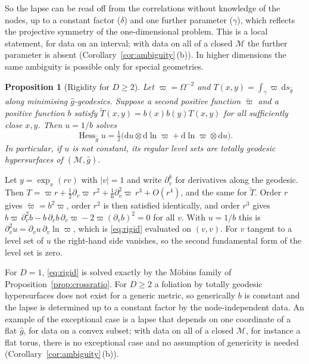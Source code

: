 \documentclass[11pt,a4paper]{article}
\makeatletter
\theoremstyle{stmt}
\newtheorem{proposition}[theorem]{Proposition}
\theoremstyle{defn}
\theoremstyle{rmk}
\renewenvironment{proof}[1][\proofname]{\par\pushQED{\qed}\normalfont\topsep6\p@\@plus6\p@\relax
  \trivlist\item[\hskip\labelsep{\sffamily\itshape\small #1.}]\ignorespaces}{\popQED\endtrivlist\@endpefalse}
\numberwithin{equation}{section}
\newcommand{\M}{\mathcal{M}}
\newcommand{\dd}{\mathrm{d}}
\makeatother
\begin{document}
So the lapse can be read off from the correlations without knowledge of the nodes, up to a constant factor ($\delta$) and one further parameter ($\gamma$), which reflects the projective symmetry of the one-dimensional problem. This is a local statement, for data on an interval; with data on all of a closed $\M$ the further parameter is absent (Corollary~\ref{cor:ambiguity}\,(b)). In higher dimensions the same ambiguity is possible only for special geometries.

\begin{proposition}[Rigidity for $D\ge2$]\label{prop:rigid}
Let $\varpi=\Omega^{-2}$ and $T(x,y)=\int_\gamma\varpi\,\dd s_{\hat g}$ along minimising $\hat g$-geodesics. Suppose a second positive function $\tilde\varpi$ and a positive function $b$ satisfy $\tilde T(x,y)=b(x)b(y)T(x,y)$ for all sufficiently close $x,y$. Then $u=1/b$ solves
\begin{equation}\label{eq:rigid}
\operatorname{Hess}_{\hat g}u=\tfrac12\big(\dd u\otimes\dd\ln\varpi+\dd\ln\varpi\otimes\dd u\big).
\end{equation}
In particular, if $u$ is not constant, its regular level sets are totally geodesic hypersurfaces of $(\M,\hat g)$.
\end{proposition}

\begin{proof}
Let $y=\exp_x(rv)$ with $|v|=1$ and write $\partial_v^k$ for derivatives along the geodesic. Then $T=\varpi r+\tfrac12\partial_v\varpi\,r^2+\tfrac16\partial_v^2\varpi\,r^3+O(r^4)$, and the same for $\tilde T$. Order $r$ gives $\tilde\varpi=b^2\varpi$, order $r^2$ is then satisfied identically, and order $r^3$ gives $b\varpi\,\partial_v^2b-b\,\partial_vb\,\partial_v\varpi-2\varpi(\partial_vb)^2=0$ for all $v$. With $u=1/b$ this is $\partial_v^2u=\partial_vu\,\partial_v\ln\varpi$, which is \eqref{eq:rigid} evaluated on $(v,v)$. For $v$ tangent to a level set of $u$ the right-hand side vanishes, so the second fundamental form of the level set is zero.
\end{proof}

For $D=1$, \eqref{eq:rigid} is solved exactly by the M\"obius family of Proposition~\ref{prop:crossratio}. For $D\ge2$ a foliation by totally geodesic hypersurfaces does not exist for a generic metric, so generically $b$ is constant and the lapse is determined up to a constant factor by the node-independent data. An example of the exceptional case is a lapse that depends on one coordinate of a flat $\hat g$, for data on a convex subset; with data on all of a closed $\M$, for instance a flat torus, there is no exceptional case and no assumption of genericity is needed (Corollary~\ref{cor:ambiguity}\,(b)).
\end{document}
